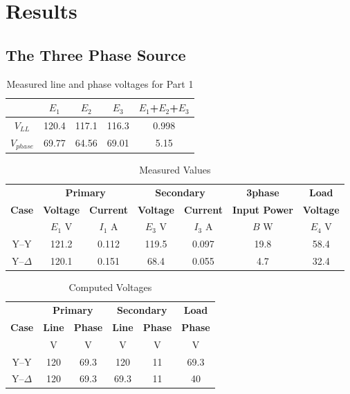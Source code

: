 \documentclass{article}
\begin{document}
\section{Results}
\subsection{The Three Phase Source}
\begin{table}[H]
  \centering
  \begin{tabular}{*{5}{c}}
    & \textbf{$E_1$} & \textbf{$E_2$} & \textbf{$E_3$} & \textbf{$E_1$+$E_2$+$E_3$} \\
    
    \hline
    
    \textbf{$V_{LL}$} & 120.4 & 117.1 & 116.3 & 0.998 \\
    \textbf{$V_{phase}$} & 69.77 & 64.56 & 69.01 & 5.15 \\
  \end{tabular}
  \caption{Measured line and phase voltages for Part 1}
  \label{tab:3phase_source}
\end{table}

\begin{table}[H]
  \centering
  \begin{tabular}{*{7}{c}}
    & \multicolumn{2}{c}{\textbf{Primary}} &
    \multicolumn{2}{c}{\textbf{Secondary}} & \textbf{3phase} & \textbf{Load} \\

    \textbf{Case} & \textbf{Voltage} & \textbf{Current} & \textbf{Voltage} &
    \textbf{Current} & \textbf{Input Power} & \textbf{Voltage} \\

    & $E_1$ V & $I_1$ A & $E_3$ V & $I_3$ A & $B$ W & $E_4$ V \\

    \hline
    Y--Y        & 121.2 & 0.112 & 119.5 & 0.097 & 19.8 & 58.4 \\
    Y--$\Delta$ & 120.1 & 0.151 & 68.4 & 0.055 & 4.7 & 32.4 \\
  \end{tabular}
  \caption{Measured Values}
  \label{tab:results}
\end{table}

\begin{table}[H]
  \centering
  \begin{tabular}{*{6}{c}}

    & \multicolumn{2}{c}{\textbf{Primary}}
    & \multicolumn{2}{c}{\textbf{Secondary}} & \textbf{Load} \\

    \textbf{Case} & \textbf{Line} & \textbf{Phase} & \textbf{Line} &
    \textbf{Phase} & \textbf{Phase} \\

    & V & V & V & V & V \\
    \hline

    Y--Y        & 120 & 69.3 & 120 & 11 & 69.3 \\
    Y--$\Delta$ & 120 & 69.3 & 69.3 & 11 & 40 \\
  \end{tabular}
  \caption{Computed Voltages}
  \label{tab:volt_comp}
\end{table}
\end{document}
